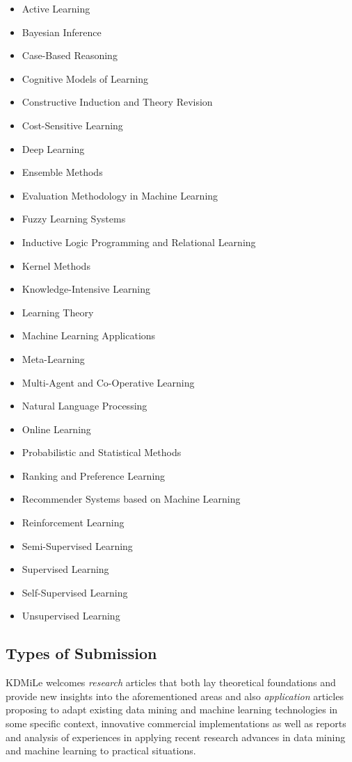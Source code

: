 \documentclass[kdmile,a4paper]{kdmile} %
\begin{document}
\begin{enumerate}
\begin{itemize}
\item Active Learning
\item Bayesian Inference
\item Case-Based Reasoning
\item Cognitive Models of Learning
\item Constructive Induction and Theory Revision
\item Cost-Sensitive Learning
\item Deep Learning
\item Ensemble Methods
\item Evaluation Methodology in Machine Learning
\item Fuzzy Learning Systems
\item Inductive Logic Programming and Relational Learning
\item Kernel Methods
\item Knowledge-Intensive Learning 
\item Learning Theory
\item Machine Learning Applications
\item Meta-Learning
\item Multi-Agent and Co-Operative Learning
\item Natural Language Processing
\item Online Learning
\item Probabilistic and Statistical Methods
\item Ranking and Preference Learning
\item Recommender Systems based on Machine Learning
\item Reinforcement Learning
\item Semi-Supervised Learning
\item Supervised Learning
\item Self-Supervised Learning
\item Unsupervised Learning
\end{itemize}

\end{enumerate}

\subsection{Types of Submission}

KDMiLe welcomes \textit{research} articles that both lay theoretical foundations and provide new insights into the aforementioned areas and also \textit{application} articles proposing to adapt existing data mining and machine learning technologies in some specific context, innovative commercial  implementations as well as reports and analysis of experiences in applying recent research advances in data mining and machine learning  to practical situations.  
\end{document}
